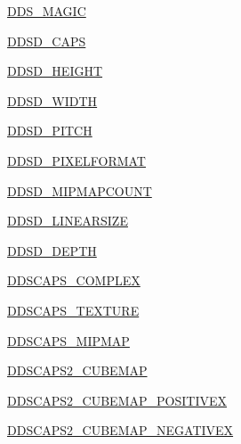 \begin{DoxyCompactItemize}
\item 
\hyperlink{namespacePIL_1_1DdsImagePlugin_afefa775430f71bee125cf7f9a5bb0aea}{D\+D\+S\+\_\+\+M\+A\+G\+IC}
\item 
\hyperlink{namespacePIL_1_1DdsImagePlugin_ad70e94ac87e46204f03e44fa2d511cc5}{D\+D\+S\+D\+\_\+\+C\+A\+PS}
\item 
\hyperlink{namespacePIL_1_1DdsImagePlugin_afd00b91aa69b5b97a3ad04df252002b0}{D\+D\+S\+D\+\_\+\+H\+E\+I\+G\+HT}
\item 
\hyperlink{namespacePIL_1_1DdsImagePlugin_aeca820b267edb516aab1bb8d339cf54a}{D\+D\+S\+D\+\_\+\+W\+I\+D\+TH}
\item 
\hyperlink{namespacePIL_1_1DdsImagePlugin_a58f89902c9b05306d7246982841eced9}{D\+D\+S\+D\+\_\+\+P\+I\+T\+CH}
\item 
\hyperlink{namespacePIL_1_1DdsImagePlugin_a575b466ceb0eba8b691a87f1196967cb}{D\+D\+S\+D\+\_\+\+P\+I\+X\+E\+L\+F\+O\+R\+M\+AT}
\item 
\hyperlink{namespacePIL_1_1DdsImagePlugin_ace402c75b4bf94900346a1e77f0f765a}{D\+D\+S\+D\+\_\+\+M\+I\+P\+M\+A\+P\+C\+O\+U\+NT}
\item 
\hyperlink{namespacePIL_1_1DdsImagePlugin_ad0fe0ba13786a8df1d6923acde05fdb7}{D\+D\+S\+D\+\_\+\+L\+I\+N\+E\+A\+R\+S\+I\+ZE}
\item 
\hyperlink{namespacePIL_1_1DdsImagePlugin_adabb9a67a4b8d806153aaf879d69d386}{D\+D\+S\+D\+\_\+\+D\+E\+P\+TH}
\item 
\hyperlink{namespacePIL_1_1DdsImagePlugin_ae0ca20a73c868b75c74554f5a7335a85}{D\+D\+S\+C\+A\+P\+S\+\_\+\+C\+O\+M\+P\+L\+EX}
\item 
\hyperlink{namespacePIL_1_1DdsImagePlugin_a2fc3cca16a0694c8fc5cf416c9be1249}{D\+D\+S\+C\+A\+P\+S\+\_\+\+T\+E\+X\+T\+U\+RE}
\item 
\hyperlink{namespacePIL_1_1DdsImagePlugin_a7fd32b7f25e8cf651d749863fee1bc57}{D\+D\+S\+C\+A\+P\+S\+\_\+\+M\+I\+P\+M\+AP}
\item 
\hyperlink{namespacePIL_1_1DdsImagePlugin_a2ff333a8bc24a0bac3f1eb1db257b7aa}{D\+D\+S\+C\+A\+P\+S2\+\_\+\+C\+U\+B\+E\+M\+AP}
\item 
\hyperlink{namespacePIL_1_1DdsImagePlugin_a771faf1586dca2d01f3b9f2642ccc0a2}{D\+D\+S\+C\+A\+P\+S2\+\_\+\+C\+U\+B\+E\+M\+A\+P\+\_\+\+P\+O\+S\+I\+T\+I\+V\+EX}
\item 
\hyperlink{namespacePIL_1_1DdsImagePlugin_a97e8de86b69c7aec619ff307d47caccb}{D\+D\+S\+C\+A\+P\+S2\+\_\+\+C\+U\+B\+E\+M\+A\+P\+\_\+\+N\+E\+G\+A\+T\+I\+V\+EX}
\item 

\end{DoxyCompactItemize}
